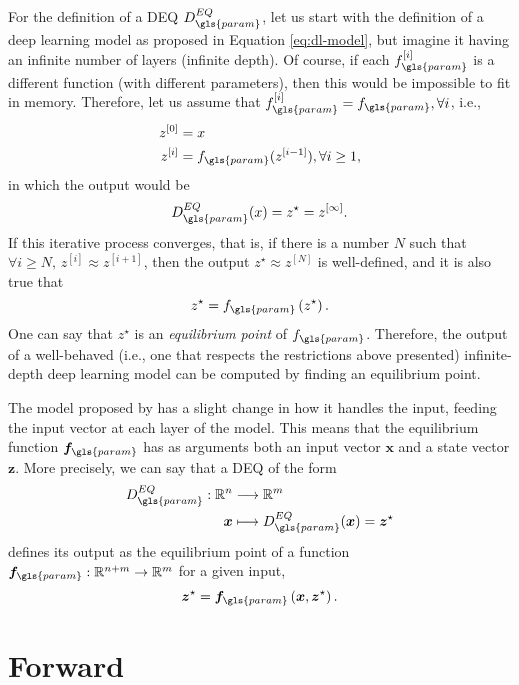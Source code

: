 For the definition of a \gls{DEQ} $D^{EQ}_{\gls{param}}$, let us start with the definition of a deep learning model as proposed in Equation \eqref{eq:dl-model}, but imagine it having an infinite number of layers (infinite depth).
Of course, if each $f^{[i]}_{\gls{param}}$ is a different function (with different parameters), then this would be impossible to fit in memory.
Therefore, let us assume that $f_{\gls{param}}^{[i]}=f_{\gls{param}},\forall i$, i.e.,
\begin{equation*}
\begin{split}
    z^{[0]} &= x \\
    z^{[i]} &= f_{\gls{param}}(z^{[i-1]}), \forall i\ge 1
,\end{split}
\end{equation*}
in which the output would be \[
D_{\gls{param}}^{EQ}(x) = z^{\star} = z^{[\infty]}
.\]
If this iterative process converges, that is, if there is a number $N$ such that $\forall i\ge N,\,z^{[i]}\approx z^{[i+1]}$, then the output $z^{\star}\approx z^{[N]}$ is well-defined, and it is also true that  \[
    z^{\star} = f_{\gls{param}}\left( z^{\star} \right) 
.\] 
One can say that $z^{\star}$ is an \emph{equilibrium point} of $f_{\gls{param}}$.
Therefore, the output of a well-behaved (i.e., one that respects the restrictions above presented) infinite-depth deep learning model can be computed by finding an equilibrium point.

The model proposed by \textcite{Bai2019} has a slight change in how it handles the input, feeding the input vector at each layer of the model.
This means that the equilibrium function $\bm{f}_{\gls{param}}$ has as arguments both an input vector $\bm{x}$ and a state vector $\bm{z}$.
More precisely, we can say that a \gls{DEQ} of the form
\begin{align*}
    D^{EQ}_{\gls{param}}: \R^{n} &\longrightarrow \R^{m} \\
    \bm{x} &\longmapsto D^{EQ}_{\gls{param}}(\bm{x}) = \bm{z}^{\star}
\end{align*}
defines its output as the equilibrium point of a function $\bm{f}_{\gls{param}}:\R^{n+m}\to \R^{m}$ for a given input, 
\begin{equation}\label{eq:z-star}
    \bm{z}^{\star} = \bm{f}_{\gls{param}}\left( \bm{x},\bm{z}^{\star} \right) 
.\end{equation}

\section{Forward}\label{sec:deq-forward}

